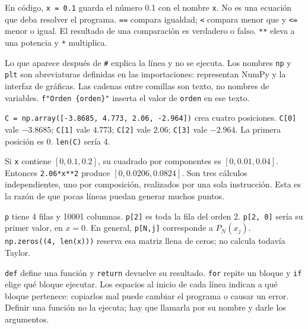 En código, \texttt{x = 0.1} guarda el número 0.1 con el nombre \texttt{x}. No es una ecuación que deba resolver el programa. \texttt{==} compara igualdad; \texttt{<} compara menor que y \texttt{<=} menor o igual. El resultado de una comparación es verdadero o falso. \texttt{**} eleva a una potencia y \texttt{*} multiplica.

Lo que aparece después de \texttt{\#} explica la línea y no se ejecuta. Los nombres \texttt{np} y \texttt{plt} son abreviaturas definidas en las importaciones: representan NumPy y la interfaz de gráficas. Las cadenas entre comillas son texto, no nombres de variables. \texttt{f"Orden \{orden\}"} inserta el valor de \texttt{orden} en ese texto.

\texttt{C = np.array([-3.8685, 4.773, 2.06, -2.964])} crea cuatro posiciones. \texttt{C[0]} vale $-3.8685$; \texttt{C[1]} vale $4.773$; \texttt{C[2]} vale $2.06$; \texttt{C[3]} vale $-2.964$. La primera posición es 0. \texttt{len(C)} sería 4.

Si \texttt{x} contiene $[0,0.1,0.2]$, su cuadrado por componentes es $[0,0.01,0.04]$. Entonces \texttt{2.06*x**2} produce $[0,0.0206,0.0824]$. Son tres cálculos independientes, uno por composición, realizados por una sola instrucción. Esta es la razón de que pocas líneas puedan generar muchos puntos.

\texttt{p} tiene 4 filas y 10001 columnas. \texttt{p[2]} es toda la fila del orden 2. \texttt{p[2, 0]} sería su primer valor, en $x=0$. En general, \texttt{p[N,j]} corresponde a $P_N(x_j)$. \texttt{np.zeros((4, len(x)))} reserva esa matriz llena de ceros; no calcula todavía Taylor.

\texttt{def} define una función y \texttt{return} devuelve su resultado. \texttt{for} repite un bloque y \texttt{if} elige qué bloque ejecutar. Los espacios al inicio de cada línea indican a qué bloque pertenece: copiarlos mal puede cambiar el programa o causar un error. Definir una función no la ejecuta; hay que llamarla por su nombre y darle los argumentos.

